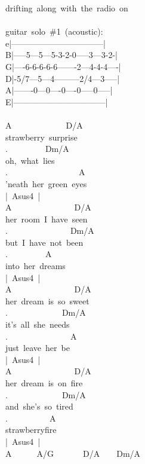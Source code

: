{drifting\ along\ with\ the\ radio\ on\\
\\
guitar\ solo\ \#1\ (acoustic):\\
e|---------------------------------|\\
B|-----5---5---5-3-2-0-----3---3-2-|\\
G|----6-6-6-6-6-------2---4-4-4----|\\
D|-5/7---5---4---------2/4---3-----|\\
A|-------0---0----0----0-----0-----|\\
E|---------------------------------|\\
\\
A\ \ \ \ \ \ \ \ \ \ \ \ \ D/A\\
strawberry\ surprise\\
.\ \ \ \ \ \ \ \ \ Dm/A\\
oh,\ what\ lies\\
.\ \ \ \ \ \ \ \ \ \ \ \ \ \ \ \ \ A\\
'neath\ her\ green\ eyes\\
|\ Asus4\ |\\
A\ \ \ \ \ \ \ \ \ \ \ \ \ \ \ D/A\\
her\ room\ I\ have\ seen\\
.\ \ \ \ \ \ \ \ \ \ \ \ \ \ \ Dm/A\\
but\ I\ have\ not\ been\\
.\ \ \ \ \ \ \ \ \ A\\
into\ her\ dreams\\
|\ Asus4\ |\\
A\ \ \ \ \ \ \ \ \ \ \ \ \ \ \ D/A\\
her\ dream\ is\ so\ sweet\\
.\ \ \ \ \ \ \ \ \ \ \ \ \ Dm/A\\
it's\ all\ she\ needs\\
.\ \ \ \ \ \ \ \ \ \ \ \ \ \ \ A\\
just\ leave\ her\ be\\
|\ Asus4\ |\\
A\ \ \ \ \ \ \ \ \ \ \ \ \ \ \ D/A\\
her\ dream\ is\ on\ fire\\
.\ \ \ \ \ \ \ \ \ \ \ \ \ Dm/A\\
and\ she's\ so\ tired\\
.\ \ \ \ \ \ \ \ \ \ A\\
strawberryfire\\
|\ Asus4\ |\\
A\ \ \ \ \ \ A/G\ \ \ \ \ \ \ D/A\ \ \ \ Dm/A\\
}
